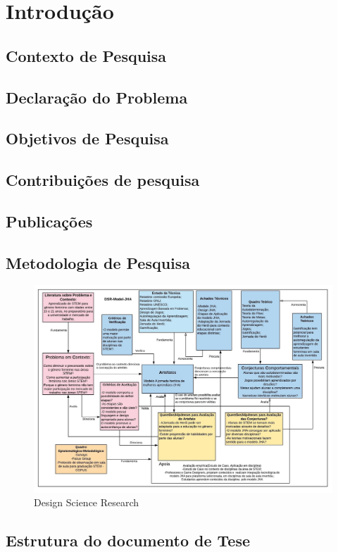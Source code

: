 \chapter{Introdução}

\section{Contexto de Pesquisa}

\section{Declaração do Problema}

\section{Objetivos de Pesquisa}


\section{Contribuições de pesquisa}


\section{Publicações}

\section{Metodologia de Pesquisa}

\begin{figure}
    \centering
    \includegraphics[width=.9\textwidth]{chaps/Images/DSR-GFeminino.jpeg}
    \caption{Design Science Research}
    \label{fig:dsr}
\end{figure}

\section{Estrutura do documento de Tese}




